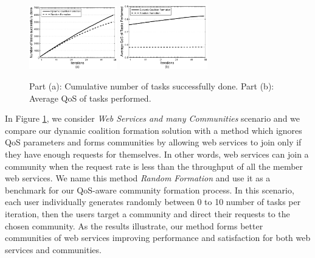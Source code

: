 \documentclass[10pt,journal,cspaper,compsoc]{IEEEtran}
\begin{document}
\begin{figure}%
\centering
\includegraphics[width=1.5in]{s2_task_done.eps}
\includegraphics[width=1.5in]{s2_task_qos.eps}
\caption{Part (a): Cumulative number of tasks successfully done.
Part (b): Average QoS of tasks performed.} \label{performancemany}
\end{figure}


In Figure \ref{performancemany}, we consider \emph{Web Services
and many Communities} scenario and we compare our dynamic
coalition formation solution with a method which ignores QoS
parameters and forms communities by allowing web services to join
only if they have enough requests for themselves. In other words,
web services can join a community when the request rate is less
than the throughput of all the member web services. We name this
method \emph{Random Formation} and use it as a benchmark for our
QoS-aware community formation process. In this scenario, each user
individually generates randomly between 0 to 10 number of tasks
per iteration, then the users target a community and direct their
requests to the chosen community. As the results illustrate, our
method forms better communities of web services improving
performance and satisfaction for both web services and
communities.
\end{document}

